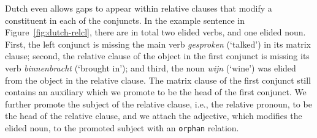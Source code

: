 \documentclass[11pt]{article}
\begin{document}
Dutch even allows gaps to appear within relative clauses that modify a constituent in each of the conjuncts. In the example sentence in Figure~\ref{fig:dutch-relcl}, there are in total two elided verbs, and one elided noun. First, the left conjunct is missing the main verb \textit{gesproken} (`talked') in its matrix clause; second, the relative clause of the object in the first conjunct is missing its verb \textit{binnenbracht} (`brought in'); and third, the noun \textit{wijn} (`wine') was elided from the object in the relative clause. The matrix clause of the first conjunct still contains an auxiliary which we 
promote to be the head of the first conjunct. We further promote the subject of the relative clause, i.e., the relative pronoun, to be the head of the relative clause, and we attach the adjective, which modifies the elided noun, to the promoted subject with an \texttt{orphan} relation.
\end{document}

